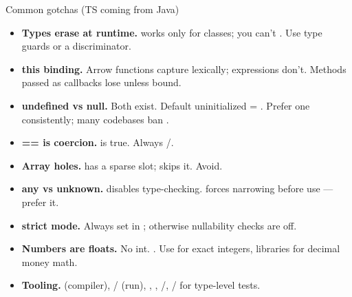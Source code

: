 \documentclass[10pt]{article}
\begin{document}
\begin{construct}{Common gotchas (TS coming from Java)}
\noindent
\begin{minipage}[t]{\linewidth}
\small
\begin{itemize}[leftmargin=*, itemsep=1pt, topsep=1pt]
  \item \textbf{Types erase at runtime.}  works only for classes; you can't . Use type guards or a  discriminator.
  \item \textbf{this binding.} Arrow functions capture  lexically;  expressions don't. Methods passed as callbacks lose  unless bound.
  \item \textbf{undefined vs null.} Both exist. Default uninitialized = . Prefer one consistently; many codebases ban .
  \item \textbf{== is coercion.}  is true. Always \code{===}/\code{!==}.
  \item \textbf{Array holes.} \code{[1,,3]} has a sparse slot;  skips it. Avoid.
  \item \textbf{any vs unknown.}  disables type-checking.  forces narrowing before use --- prefer it.
  \item \textbf{strict mode.} Always set  in ; otherwise nullability checks are off.
  \item \textbf{Numbers are floats.} No int. . Use  for exact integers, libraries for decimal money math.
  \item \textbf{Tooling.}  (compiler), / (run), , , /, / for type-level tests.
\end{itemize}
\end{minipage}
\end{construct}
\end{document}
